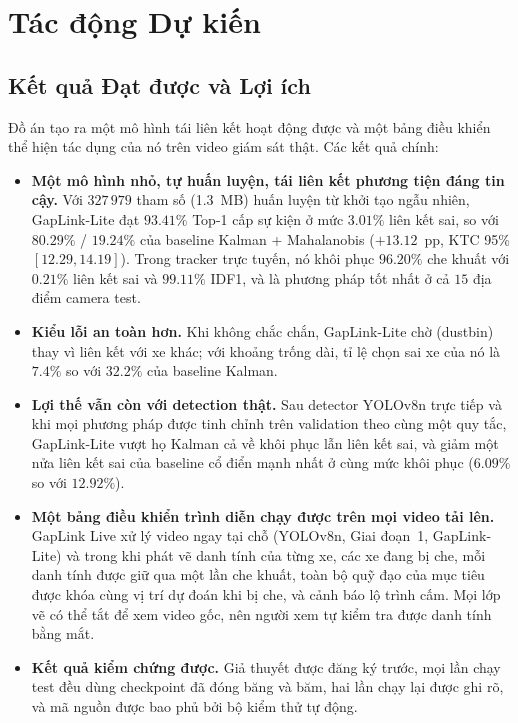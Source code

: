\chapter{Tác động Dự kiến}
\label{chap:projected_impact}

\section{Kết quả Đạt được và Lợi ích}
\label{sec:accomplishments}

Đồ án tạo ra một mô hình tái liên kết hoạt động được và một bảng điều khiển thể hiện tác dụng của nó trên video giám sát thật. Các kết quả chính:
\begin{itemize}
    \item \textbf{Một mô hình nhỏ, tự huấn luyện, tái liên kết phương tiện đáng tin cậy.} Với $327\,979$ tham số (1.3~MB) huấn luyện từ khởi tạo ngẫu nhiên, GapLink-Lite đạt $93.41\%$ Top-1 cấp sự kiện ở mức $3.01\%$ liên kết sai, so với $80.29\%$ / $19.24\%$ của baseline Kalman + Mahalanobis ($+13.12$~pp, KTC 95\% $[12.29, 14.19]$). Trong tracker trực tuyến, nó khôi phục $96.20\%$ che khuất với $0.21\%$ liên kết sai và $99.11\%$ IDF1, và là phương pháp tốt nhất ở cả $15$ địa điểm camera test.
    \item \textbf{Kiểu lỗi an toàn hơn.} Khi không chắc chắn, GapLink-Lite chờ (dustbin) thay vì liên kết với xe khác; với khoảng trống dài, tỉ lệ chọn sai xe của nó là $7.4\%$ so với $32.2\%$ của baseline Kalman.
    \item \textbf{Lợi thế vẫn còn với detection thật.} Sau detector YOLOv8n trực tiếp và khi mọi phương pháp được tinh chỉnh trên validation theo cùng một quy tắc, GapLink-Lite vượt họ Kalman cả về khôi phục lẫn liên kết sai, và giảm một nửa liên kết sai của baseline cổ điển mạnh nhất ở cùng mức khôi phục ($6.09\%$ so với $12.92\%$).
    \item \textbf{Một bảng điều khiển trình diễn chạy được trên mọi video tải lên.} GapLink Live xử lý video ngay tại chỗ (YOLOv8n, Giai đoạn~1, GapLink-Lite) và trong khi phát vẽ danh tính của từng xe, các xe đang bị che, mỗi danh tính được giữ qua một lần che khuất, toàn bộ quỹ đạo của mục tiêu được khóa cùng vị trí dự đoán khi bị che, và cảnh báo lộ trình cấm. Mọi lớp vẽ có thể tắt để xem video gốc, nên người xem tự kiểm tra được danh tính bằng mắt.
    \item \textbf{Kết quả kiểm chứng được.} Giả thuyết được đăng ký trước, mọi lần chạy test đều dùng checkpoint đã đóng băng và băm, hai lần chạy lại được ghi rõ, và mã nguồn được bao phủ bởi bộ kiểm thử tự động.
\end{itemize}

